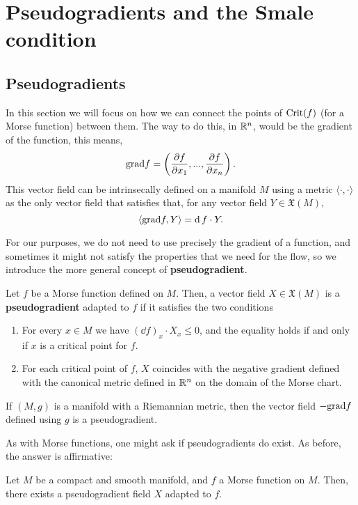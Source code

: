 \section{Pseudogradients and the Smale condition} \label{section:pseudogradients}

\subsection{Pseudogradients}

In this section we will focus on how we can connect the points of $\text{Crit}(f)$ (for a Morse function) between them. The way to do this, in $\mathbb{R}^n$, would be the gradient of the function, this means,
$$\text{grad} f = \left( \frac{\partial f}{\partial x_1},...,\frac{\partial f}{\partial x_n} \right) .$$
This vector field can be intrinsecally defined on a manifold $M$ using a metric $\langle \cdot , \cdot \rangle$ as the only vector field that satisfies that, for any vector field $Y \in \mathfrak{X}(M)$,
$$\langle \text{grad} f, Y \rangle = \operatorname d f \cdot Y .$$

For our purposes, we do not need to use precisely the gradient of a function, and sometimes it might not satisfy the properties that we need for the flow, so we introduce the more general concept of {\bf pseudogradient}.

\begin{deff}
Let $f$ be a Morse function defined on $M$. Then, a vector field $X \in \mathfrak{X}(M)$ is a {\bf pseudogradient} adapted to $f$ if it satisfies the two conditions

\begin{enumerate}
\item For every $x \in M$ we have $(\dd f)_x \cdot X_x \leq 0$, and the equality holds if and only if $x$ is a critical point for $f$.
\item For each critical point of $f$, $X$ coincides with the negative gradient defined with the canonical metric defined in $\mathbb{R}^n$ on the domain of the Morse chart.
\end{enumerate}
\end{deff}

\begin{rmrk}
If $(M,g)$ is a manifold with a Riemannian metric, then the vector field $- \text{grad} f$ defined using $g$ is a pseudogradient.
\end{rmrk}

As with Morse functions, one might ask if pseudogradients do exist. As before, the answer is affirmative:

\begin{prop}
Let $M$ be a compact and smooth manifold, and $f$ a Morse function on $M$. Then, there exists a pseudogradient field $X$ adapted to $f$.
\end{prop}

